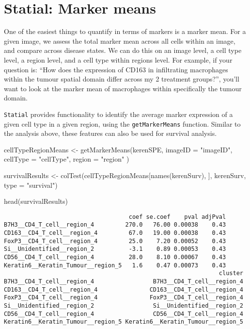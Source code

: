 \documentclass[
  letterpaper,
  DIV=11,
  numbers=noendperiod]{scrreprt}
\newenvironment{Shaded}{\begin{snugshade}}{\end{snugshade}}
\newcommand{\AttributeTok}[1]{\textcolor[rgb]{0.40,0.45,0.13}{#1}}
\newcommand{\FunctionTok}[1]{\textcolor[rgb]{0.28,0.35,0.67}{#1}}
\newcommand{\NormalTok}[1]{\textcolor[rgb]{0.00,0.23,0.31}{#1}}
\newcommand{\OtherTok}[1]{\textcolor[rgb]{0.00,0.23,0.31}{#1}}
\newcommand{\StringTok}[1]{\textcolor[rgb]{0.13,0.47,0.30}{#1}}
\begin{document}
\section{Statial: Marker means}\label{statial-marker-means}

One of the easiest things to quantify in terms of markers is a marker
mean. For a given image, we assess the total marker mean across all
cells within an image, and compare across disease states. We can do this
on an image level, a cell type level, a region level, and a cell type
within regions level. For example, if your question is: ``How does the
expression of CD163 in infiltrating macrophages within the tumour
spatial domain differ across my 2 treatment groups?'', you'll want to
look at the marker mean of macrophages within specifically the tumour
domain.

\texttt{Statial} provides functionality to identify the average marker
expression of a given cell type in a given region, using the
\texttt{getMarkerMeans} function. Similar to the analysis above, these
features can also be used for survival analysis.

\begin{Shaded}
\begin{Highlighting}[]
\NormalTok{cellTypeRegionMeans }\OtherTok{\textless{}{-}} \FunctionTok{getMarkerMeans}\NormalTok{(kerenSPE,}
  \AttributeTok{imageID =} \StringTok{"imageID"}\NormalTok{,}
  \AttributeTok{cellType =} \StringTok{"cellType"}\NormalTok{,}
  \AttributeTok{region =} \StringTok{"region"}
\NormalTok{)}

\NormalTok{survivalResults }\OtherTok{\textless{}{-}} \FunctionTok{colTest}\NormalTok{(cellTypeRegionMeans[}\FunctionTok{names}\NormalTok{(kerenSurv), ], kerenSurv, }\AttributeTok{type =} \StringTok{"survival"}\NormalTok{)}

\FunctionTok{head}\NormalTok{(survivalResults)}
\end{Highlighting}
\end{Shaded}

\begin{verbatim}
                                    coef se.coef    pval adjPval
B7H3__CD4_T_cell__region_4         270.0   76.00 0.00038    0.43
CD163__CD4_T_cell__region_4         67.0   19.00 0.00038    0.43
FoxP3__CD4_T_cell__region_4         25.0    7.20 0.00052    0.43
Si__Unidentified__region_2          -3.1    0.89 0.00053    0.43
CD56__CD4_T_cell__region_4          28.0    8.10 0.00067    0.43
Keratin6__Keratin_Tumour__region_5   1.6    0.47 0.00073    0.43
                                                              cluster
B7H3__CD4_T_cell__region_4                 B7H3__CD4_T_cell__region_4
CD163__CD4_T_cell__region_4               CD163__CD4_T_cell__region_4
FoxP3__CD4_T_cell__region_4               FoxP3__CD4_T_cell__region_4
Si__Unidentified__region_2                 Si__Unidentified__region_2
CD56__CD4_T_cell__region_4                 CD56__CD4_T_cell__region_4
Keratin6__Keratin_Tumour__region_5 Keratin6__Keratin_Tumour__region_5
\end{verbatim}
\end{document}
